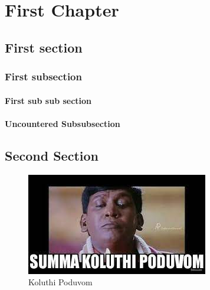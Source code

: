 \chapter{First Chapter}\label{ch:chapter-name}
    \section{First section}\label{sec:sec1-name}
        \lipsum[1]
        \subsection{First subsection}\label{sec:sub-sec-name}
            \lipsum[2]
            \subsubsection{First sub sub section}\label{sec:sub-sub-sec-name}
                \lipsum[3]
            \subsubsection*{Uncountered Subsubsection}\label{}
                \lipsum[4]
    \section{Second Section}
        \lipsum[5]\cite{Article1}
        \begin{figure}[!ht]
            \centering
            \includegraphics[scale = 1]{images/fire.jpg}
            \caption{ Koluthi Poduvom}
        \end{figure}